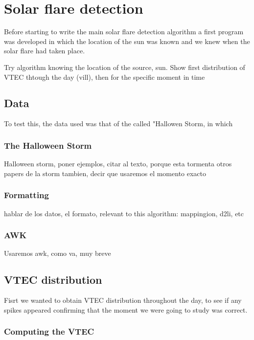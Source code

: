 \chapter{Solar flare detection}

Before starting to write the main solar flare detection algorithm a first program was developed in which the location of the sun was known and we knew when the solar flare had taken place.

Try algorithm knowing the location of the source, sun. Show first distribution of VTEC thtough the day (vill), then for the specific moment in time


\section{Data}

To test this, the data used was that of the called "Hallowen Storm, in which 

\subsection{The Halloween Storm}

Halloween storm, poner ejemplos, citar al texto, porque esta tormenta otros papers de la storm tambien, decir que usaremos el momento exacto

\subsection{Formatting}
hablar de los datos, el formato, relevant to this algorithm: mappingion, d2li, etc

\subsection{AWK}

Usaremos awk, como va, muy breve



\section{VTEC distribution}

Fisrt we wanted to obtain VTEC distribution throughout the day, to see if any spikes appeared confirming that the moment we were going to study was correct.



\subsection{Computing the VTEC}

